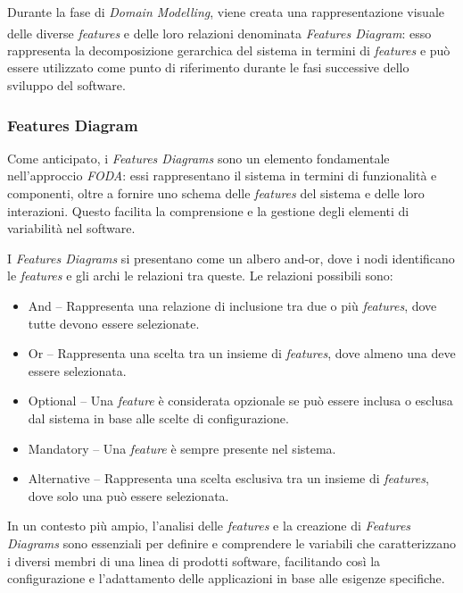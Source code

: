 \documentclass[12pt]{report}
\newcommand{\myref}[1]{\textsuperscript{\hyperref[#1]{\ding{70}}}}
\newcommand{\foda}{\textsl{FODA}\xspace}
\begin{document}
Durante la fase di \textit{Domain Modelling}, viene creata una rappresentazione visuale delle diverse \textit{features} e delle loro relazioni denominata \textit{Features Diagram}\myref{sec:features_diagram}: esso rappresenta la decomposizione gerarchica del sistema in termini di \textit{features} e può essere utilizzato come punto di riferimento durante le fasi successive dello sviluppo del software.


\subsubsection{Features Diagram}
\label{sec:features_diagram}
Come anticipato, i \textit{Features Diagrams} sono un elemento fondamentale nell'approccio \foda: essi rappresentano il sistema in termini di funzionalità e componenti, oltre a fornire uno schema delle \textit{features} del sistema e delle loro interazioni. Questo facilita la comprensione e la gestione degli elementi di variabilità nel software.

I \textit{Features Diagrams} si presentano come un albero and-or, dove i nodi identificano le \textit{features} e gli archi le relazioni tra queste. Le relazioni possibili sono:

\begin{itemize}
\item \textsf{And} -- Rappresenta una relazione di inclusione tra due o più \textit{features}, dove tutte devono essere selezionate.
\item \textsf{Or} -- Rappresenta una scelta tra un insieme di \textit{features}, dove almeno una deve essere selezionata.
\item \textsf{Optional} -- Una \textit{feature} è considerata opzionale se può essere inclusa o esclusa dal sistema in base alle scelte di configurazione.
\item \textsf{Mandatory} -- Una \textit{feature} è sempre presente nel sistema.
\item \textsf{Alternative} -- Rappresenta una scelta esclusiva tra un insieme di \textit{features}, dove solo una può essere selezionata.
\end{itemize}

In un contesto più ampio, l'analisi delle \textit{features} e la creazione di \textit{Features Diagrams} sono essenziali per definire e comprendere le variabili che caratterizzano i diversi membri di una linea di prodotti software, facilitando così la configurazione e l'adattamento delle applicazioni in base alle esigenze specifiche.
\end{document}
